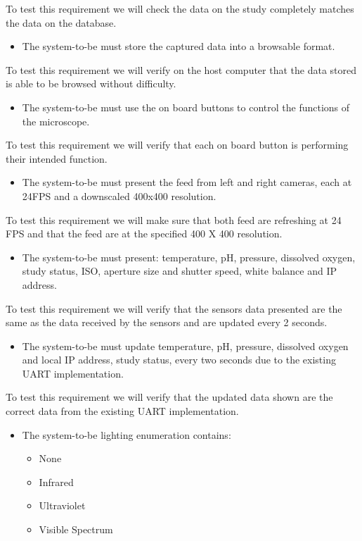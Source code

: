 To test this requirement we will check the data on the study completely matches the data on the database.
\begin{itemize}
    \item The system-to-be must store the captured data into a browsable format.
\end{itemize}
To test this requirement we will verify on the host computer that the data stored is able to be browsed without difficulty.
\begin{itemize}
    \item The system-to-be must use the on board buttons to control the functions of the microscope.
\end{itemize}
To test this requirement we will verify that each on board button is performing their intended function.
\begin{itemize}
   \item The system-to-be must present the feed from left and right cameras, each at 24FPS and a downscaled 400x400 resolution.
\end{itemize}
To test this requirement we will make sure that both feed are refreshing at 24 FPS and that the feed are at the specified 400 X 400 resolution.
\begin{itemize}
    \item The system-to-be must present: temperature, pH, pressure, dissolved oxygen, study status, ISO, aperture size and shutter speed, white balance and IP address.
\end{itemize}
To test this requirement we will verify that the sensors data presented are the same as the data received by the sensors and are updated every 2 seconds.
\begin{itemize}
    \item The system-to-be must update temperature, pH, pressure, dissolved oxygen and local IP address, study status, every two seconds due to the existing UART implementation.
\end{itemize}
To test this requirement we will verify that the updated data shown are the correct data from the existing UART implementation.
\begin{itemize}
    \item The system-to-be lighting enumeration contains:
    \begin{itemize}
        \item None
        \item Infrared
        \item Ultraviolet
        \item Visible Spectrum
    \end{itemize}
\end{itemize}
